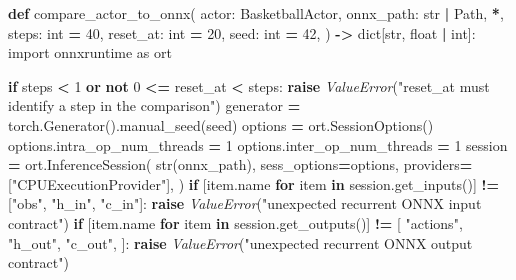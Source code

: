 \documentclass[
  american,
  11pt,
  letterpaper,
]{article}
\newenvironment{Shaded}{\begin{snugshade}}{\end{snugshade}}
\newcommand{\BuiltInTok}[1]{#1}
\newcommand{\ControlFlowTok}[1]{\textcolor[rgb]{0.13,0.29,0.53}{\textbf{#1}}}
\newcommand{\DecValTok}[1]{\textcolor[rgb]{0.00,0.00,0.81}{#1}}
\newcommand{\ImportTok}[1]{#1}
\newcommand{\KeywordTok}[1]{\textcolor[rgb]{0.13,0.29,0.53}{\textbf{#1}}}
\newcommand{\NormalTok}[1]{#1}
\newcommand{\OperatorTok}[1]{\textcolor[rgb]{0.81,0.36,0.00}{\textbf{#1}}}
\newcommand{\PreprocessorTok}[1]{\textcolor[rgb]{0.56,0.35,0.01}{\textit{#1}}}
\newcommand{\StringTok}[1]{\textcolor[rgb]{0.31,0.60,0.02}{#1}}
\renewenvironment{Shaded}{\par\smallskip}{\par\smallskip}
\begin{document}
\begin{Shaded}
\begin{Highlighting}[]
\KeywordTok{def}\NormalTok{ compare\_actor\_to\_onnx(}
\NormalTok{    actor: BasketballActor,}
\NormalTok{    onnx\_path: }\BuiltInTok{str} \OperatorTok{|}\NormalTok{ Path,}
    \OperatorTok{*}\NormalTok{,}
\NormalTok{    steps: }\BuiltInTok{int} \OperatorTok{=} \DecValTok{40}\NormalTok{,}
\NormalTok{    reset\_at: }\BuiltInTok{int} \OperatorTok{=} \DecValTok{20}\NormalTok{,}
\NormalTok{    seed: }\BuiltInTok{int} \OperatorTok{=} \DecValTok{42}\NormalTok{,}
\NormalTok{) }\OperatorTok{{-}\textgreater{}} \BuiltInTok{dict}\NormalTok{[}\BuiltInTok{str}\NormalTok{, }\BuiltInTok{float} \OperatorTok{|} \BuiltInTok{int}\NormalTok{]:}
    \ImportTok{import}\NormalTok{ onnxruntime }\ImportTok{as}\NormalTok{ ort}

    \ControlFlowTok{if}\NormalTok{ steps }\OperatorTok{\textless{}} \DecValTok{1} \KeywordTok{or} \KeywordTok{not} \DecValTok{0} \OperatorTok{\textless{}=}\NormalTok{ reset\_at }\OperatorTok{\textless{}}\NormalTok{ steps:}
        \ControlFlowTok{raise} \PreprocessorTok{ValueError}\NormalTok{(}\StringTok{"reset\_at must identify a step in the comparison"}\NormalTok{)}
\NormalTok{    generator }\OperatorTok{=}\NormalTok{ torch.Generator().manual\_seed(seed)}
\NormalTok{    options }\OperatorTok{=}\NormalTok{ ort.SessionOptions()}
\NormalTok{    options.intra\_op\_num\_threads }\OperatorTok{=} \DecValTok{1}
\NormalTok{    options.inter\_op\_num\_threads }\OperatorTok{=} \DecValTok{1}
\NormalTok{    session }\OperatorTok{=}\NormalTok{ ort.InferenceSession(}
        \BuiltInTok{str}\NormalTok{(onnx\_path),}
\NormalTok{        sess\_options}\OperatorTok{=}\NormalTok{options,}
\NormalTok{        providers}\OperatorTok{=}\NormalTok{[}\StringTok{"CPUExecutionProvider"}\NormalTok{],}
\NormalTok{    )}
    \ControlFlowTok{if}\NormalTok{ [item.name }\ControlFlowTok{for}\NormalTok{ item }\KeywordTok{in}\NormalTok{ session.get\_inputs()] }\OperatorTok{!=}\NormalTok{ [}\StringTok{"obs"}\NormalTok{, }\StringTok{"h\_in"}\NormalTok{, }\StringTok{"c\_in"}\NormalTok{]:}
        \ControlFlowTok{raise} \PreprocessorTok{ValueError}\NormalTok{(}\StringTok{"unexpected recurrent ONNX input contract"}\NormalTok{)}
    \ControlFlowTok{if}\NormalTok{ [item.name }\ControlFlowTok{for}\NormalTok{ item }\KeywordTok{in}\NormalTok{ session.get\_outputs()] }\OperatorTok{!=}\NormalTok{ [}
        \StringTok{"actions"}\NormalTok{,}
        \StringTok{"h\_out"}\NormalTok{,}
        \StringTok{"c\_out"}\NormalTok{,}
\NormalTok{    ]:}
        \ControlFlowTok{raise} \PreprocessorTok{ValueError}\NormalTok{(}\StringTok{"unexpected recurrent ONNX output contract"}\NormalTok{)}

\end{Highlighting}
\end{Shaded}
\end{document}
